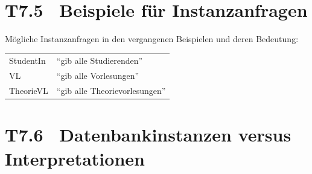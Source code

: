 \documentclass[fontsize=11pt, twoside=false, numbers=autoenddot]{scrbook}
\begin{document}
\goodbreak
\section*{T7.5~ Beispiele für Instanzanfragen}

Mögliche Instanzanfragen in den vergangenen Beispielen und deren Bedeutung:
%
\begin{center}
  \begin{tabular}{@{}ll@{}}
    \textsf{StudentIn} & "`gib alle Studierenden"' \\
    \textsf{VL}        & "`gib alle Vorlesungen"' \\
    \textsf{TheorieVL} & "`gib alle Theorievorlesungen"' \\
  \end{tabular}
\end{center}

\section*{T7.6~ Datenbankinstanzen versus Interpretationen}
\end{document}

